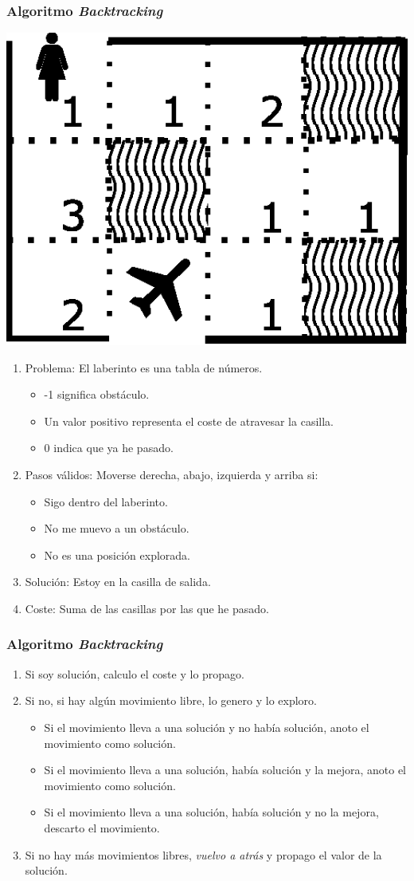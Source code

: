 \documentclass[a4paper,t,xcolor=pst,dvips,colortheme]{beamer}
\begin{document}
\begin{frame}[c]
    \frametitle{Algoritmo \emph{Backtracking}}
    \begin{center}
        \includegraphics[width=0.20\linewidth]{images/backtracking/laberinto.eps}
    \end{center}
    \begin{enumerate}[<+->]
        \item Problema: El laberinto es una tabla de números.
            \begin{itemize}
                \item -1 significa obstáculo.
                \item Un valor positivo representa el coste de atravesar la casilla.
                \item 0 indica que ya he pasado.
            \end{itemize}
        \item Pasos válidos: Moverse derecha, abajo, izquierda y arriba si:
            \begin{itemize}
                \item Sigo dentro del laberinto.
                \item No me muevo a un obstáculo.
                \item No es una posición explorada.
            \end{itemize}
        \item Solución: Estoy en la casilla de salida.
        \item Coste: Suma de las casillas por las que he pasado.
    \end{enumerate}
\end{frame}

\begin{frame}[c]
    \frametitle{Algoritmo \emph{Backtracking}}
    \begin{enumerate}[<+->]
        \item Si soy solución, calculo el coste y lo propago.
        \item Si no, si hay algún movimiento libre, lo genero y lo exploro.
        \begin{itemize}
            \item Si el movimiento lleva a una solución y no había solución, anoto el movimiento como solución.
            \item Si el movimiento lleva a una solución, había solución y la mejora, anoto el movimiento como solución.
            \item Si el movimiento lleva a una solución, había solución y no la mejora, descarto el movimiento.
        \end{itemize}
        \item Si no hay más movimientos libres, \emph{vuelvo a atrás} y propago el valor de la solución.
    \end{enumerate}
\end{frame}
\end{document}
